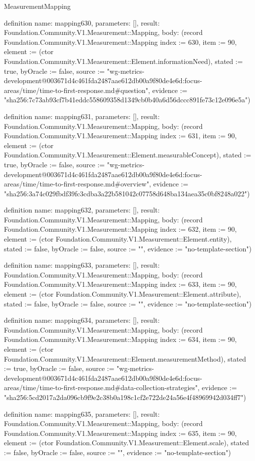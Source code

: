 \begin{lexlean}{MeasurementMapping}
\begin{semanticmodule}
definition{
  name: mapping630,
  parameters: [],
  result: Foundation.Community.V1.Measurement::Mapping,
  body: (record Foundation.Community.V1.Measurement::Mapping {index := 630, item := 90, element := (ctor Foundation.Community.V1.Measurement::Element.informationNeed), stated := true, byOracle := false, source := "wg-metrics-development@003671d4c461fda2487aae612db00a9f80de4e6d:focus-areas/time/time-to-first-response.md#question", evidence := "sha256:7c73ab93cf7b41eddc558609358d1349cb0b40a6d56dccc891fe73c12e096e5a"})
}

definition{
  name: mapping631,
  parameters: [],
  result: Foundation.Community.V1.Measurement::Mapping,
  body: (record Foundation.Community.V1.Measurement::Mapping {index := 631, item := 90, element := (ctor Foundation.Community.V1.Measurement::Element.measurableConcept), stated := true, byOracle := false, source := "wg-metrics-development@003671d4c461fda2487aae612db00a9f80de4e6d:focus-areas/time/time-to-first-response.md#overview", evidence := "sha256:3a74c029fbdf39fc3cdba3a22b581042c07758d648ba134aea35c0bf8248a022"})
}

definition{
  name: mapping632,
  parameters: [],
  result: Foundation.Community.V1.Measurement::Mapping,
  body: (record Foundation.Community.V1.Measurement::Mapping {index := 632, item := 90, element := (ctor Foundation.Community.V1.Measurement::Element.entity), stated := false, byOracle := false, source := "", evidence := "no-template-section"})
}

definition{
  name: mapping633,
  parameters: [],
  result: Foundation.Community.V1.Measurement::Mapping,
  body: (record Foundation.Community.V1.Measurement::Mapping {index := 633, item := 90, element := (ctor Foundation.Community.V1.Measurement::Element.attribute), stated := false, byOracle := false, source := "", evidence := "no-template-section"})
}

definition{
  name: mapping634,
  parameters: [],
  result: Foundation.Community.V1.Measurement::Mapping,
  body: (record Foundation.Community.V1.Measurement::Mapping {index := 634, item := 90, element := (ctor Foundation.Community.V1.Measurement::Element.measurementMethod), stated := true, byOracle := false, source := "wg-metrics-development@003671d4c461fda2487aae612db00a9f80de4e6d:focus-areas/time/time-to-first-response.md#data-collection-strategies", evidence := "sha256:5cd2017a2da096cb9f9e2c38b0a198c1cf2e722de24a56e4f48969942d034ff7"})
}

definition{
  name: mapping635,
  parameters: [],
  result: Foundation.Community.V1.Measurement::Mapping,
  body: (record Foundation.Community.V1.Measurement::Mapping {index := 635, item := 90, element := (ctor Foundation.Community.V1.Measurement::Element.scale), stated := false, byOracle := false, source := "", evidence := "no-template-section"})
}


\end{semanticmodule}
\end{lexlean}
